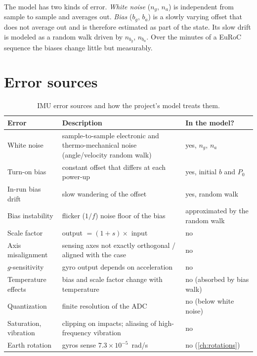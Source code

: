 The model has two kinds of error. \emph{White noise} ($n_g$, $n_a$) is independent from sample to sample and
averages out. \emph{Bias} ($b_g$, $b_a$) is a slowly varying offset that does not average out and is
therefore estimated as part of the state. Its slow drift is modeled as a random walk driven by
$n_{b_g}$, $n_{b_a}$. Over the minutes of a EuRoC sequence the biases change little but measurably.

\section{Error sources}

\begin{table}[t]
\centering\small
\begin{tabularx}{\textwidth}{@{}l X l@{}}
\toprule
\textbf{Error} & \textbf{Description} & \textbf{In the model?} \\
\midrule
White noise & sample-to-sample electronic and thermo-mechanical noise (angle/velocity random walk) & yes, $n_g$, $n_a$ \\
Turn-on bias & constant offset that differs at each power-up & yes, initial $b$ and $P_0$ \\
In-run bias drift & slow wandering of the offset & yes, random walk \\
Bias instability & flicker ($1/f$) noise floor of the bias & approximated by the random walk \\
Scale factor & output $= (1 + s)\times$ input & no \\
Axis misalignment & sensing axes not exactly orthogonal / aligned with the case & no \\
$g$-sensitivity & gyro output depends on acceleration & no \\
Temperature effects & bias and scale factor change with temperature & no (absorbed by bias walk) \\
Quantization & finite resolution of the ADC & no (below white noise) \\
Saturation, vibration & clipping on impacts; aliasing of high-frequency vibration & no \\
Earth rotation & gyros sense $7.3\times10^{-5}$~rad/s & no (\cref{ch:rotations}) \\
\bottomrule
\end{tabularx}
\caption{IMU error sources and how the project's model treats them.}
\label{tab:imu-errors}
\end{table}

